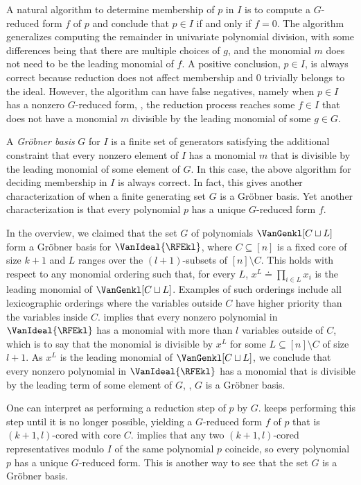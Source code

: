 A natural algorithm to determine membership of $p$ in $I$ is to compute a $G$-reduced form $f$ of $p$ and conclude that $p \in I$ if and only if $f=0$. The algorithm generalizes computing the remainder in univariate polynomial division, with some differences being that there are multiple choices of $g$, and the monomial $m$ does not need to be the leading monomial of $f$. A positive conclusion, $p \in I$, is always correct because reduction does not affect membership and $0$ trivially belongs to the ideal. However, the algorithm can have false negatives, namely when $p \in I$ has a nonzero $G$-reduced form, \ie, the reduction process reaches some $f \in I$ that does not have a monomial $m$ divisible by the leading monomial of some $g \in G$. 

A \emph{Gr\"obner basis} $G$ for $I$ is a finite set of generators satisfying the additional constraint that every nonzero element of $I$ has a monomial $m$ that is divisible by the leading monomial of some element of $G$. In this case, the above algorithm for deciding membership in $I$ is always correct. In fact, this gives another characterization of when a finite generating set $G$ is a Gr\"obner basis. Yet another characterization is that every polynomial $p$ has a unique $G$-reduced form $f$.

In the overview, we claimed that the set $G$ of polynomials $\VanGenkl[C \sqcup L]$ form a Gröbner basis for $\VanIdeal{\RFEkl}$, where $C \subseteq [n]$ is a fixed core of size $k+1$ and $L$ ranges over the $(l+1)$-subsets of $[n] \setminus C$. This holds with respect to any monomial ordering such that, for every $L$, $x^L \doteq \prod_{i \in L} x_i$ is the leading monomial of $\VanGenkl[C \sqcup L]$. Examples of such orderings include all lexicographic orderings where the variables outside $C$ have higher priority than the variables inside $C$.  implies that every nonzero polynomial in $\VanIdeal{\RFEkl}$ has a monomial with more than $l$ variables outside of $C$, which is to say that the monomial is divisible by $x^L$ for some $L \subseteq [n] \setminus C$ of size $l+1$. As $x^L$ is the leading monomial of $\VanGenkl[C \sqcup L]$, we conclude that every nonzero polynomial in $\VanIdeal{\RFEkl}$ has a monomial that is divisible by the leading term of some element of $G$, \ie, $G$ is a Gröbner basis. 

One can interpret  as performing a reduction step of $p$ by $G$.  keeps performing this step until it is no longer possible, yielding a $G$-reduced form $f$ of $p$ that is $(k+1,l)$-cored with core $C$.  implies that any two $(k+1,l)$-cored representatives modulo $I$ of the same polynomial $p$ coincide, so every polynomial $p$ has a unique $G$-reduced form. This is another way to see that the set $G$ is a Gr\"obner basis. 


